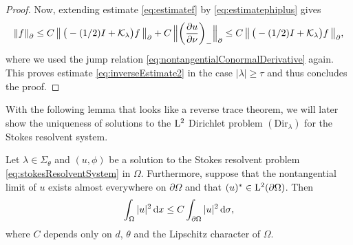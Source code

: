 \begin{proof}
  Now, extending estimate \eqref{eq:estimatef} by \eqref{eq:estimatephiplus} gives
  \begin{align*}
      \| f\|^{}_\partial 
      \leq C \, \big\| \, \big( - (1/2) I + \mathcal{K}_\lambda\big) f\, \big\|^{}_\partial + C\, \Big\| \bigg(\frac{\partial u}{\partial \nu} \bigg)_- \Big\|^{}_\partial 
    \leq C \, \big\| \, \big( - (1/2) I + \mathcal{K}_\lambda\big) f \,\big\|^{}_{\partial},
  \end{align*}
  where we used the jump relation \eqref{eq:nontangentialConormalDerivative} again.
  This proves estimate \eqref{eq:inverseEstimate2} in the case $|\lambda| \geq \tau$ and thus concludes the proof.
\end{proof}

With the following lemma that looks like a reverse trace theorem, we will later show the uniqueness of solutions to the $\mathrm{L}^2$ Dirichlet problem \hyperref[eq:dirProblem]{$(\mathrm{Dir}_\lambda)$} for the Stokes resolvent system.

\begin{lem}
  \label{lem:l2unique}
  Let $\lambda \in \Sigma_\theta$ and $(u,\phi)$ be a solution to the Stokes resolvent problem \eqref{eq:stokesResolventSystem} in $\Omega$.
  Furthermore, suppose that the nontangential limit of $u$ exists almost everywhere on $\partial\Omega$ and that $(u)^* \in \mathrm{L}^2(\partial\Omega)$.
  Then 
  \begin{align}
    \label{eq:OmegaBoundaryEstimate}
    \int_\Omega |u|^2 \, {\operatorname{d}\!{x}} \leq C \int_{\partial\Omega} |u|^2 \, {\operatorname{d}\!{\sigma}},
  \end{align}
  where $C$ depends only on $d$, $\theta$ and the Lipschitz character of $\Omega$.
\end{lem}

